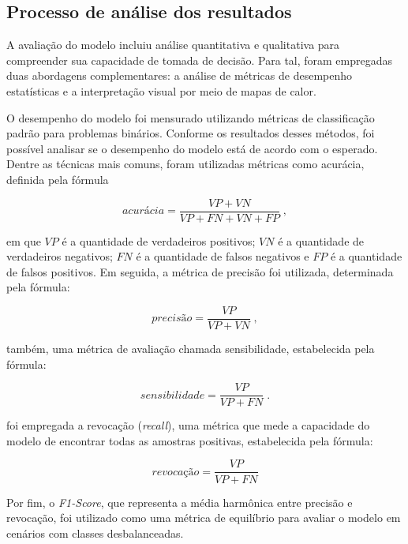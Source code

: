 \subsection{Processo de análise dos resultados}

A avaliação do modelo incluiu análise quantitativa e qualitativa para compreender sua capacidade de tomada de decisão. Para tal, foram empregadas duas abordagens complementares: a análise de métricas de desempenho estatísticas e a interpretação visual por meio de mapas de calor.

O desempenho do modelo foi mensurado utilizando métricas de classificação padrão para problemas binários. Conforme os resultados desses métodos, foi possível analisar se o desempenho do modelo está de acordo com o esperado. Dentre as técnicas mais comuns, foram utilizadas métricas como acurácia, definida pela fórmula 

\begin{equation}
  acurácia = \frac{VP +VN}{VP + FN + VN + FP} \; ,
    \label{eq: acuracia}
\end{equation}

\noindent em que \(VP\) é a quantidade de verdadeiros positivos; \(VN\) é a quantidade de verdadeiros negativos; \(FN\) é a quantidade de falsos negativos e \(FP\) é a quantidade de falsos positivos. Em seguida, a métrica de precisão foi utilizada, determinada pela fórmula:

\begin{equation} 
  precisão = \frac{VP}{VP + VN} \; ,
  \label{eq: precisao}
\end{equation}

\noindent também, uma métrica de avaliação chamada sensibilidade, estabelecida pela fórmula:

\begin{equation}
sensibilidade = \frac{VP}{VP + FN} \; .
  \label{eq: sensibilidade}
\end{equation}

\noindent foi empregada a revocação (\textit{recall}), uma métrica que mede a capacidade do modelo de encontrar todas as amostras positivas, estabelecida pela fórmula:

\begin{equation}
revocação = \frac{VP}{VP + FN}
  \label{eq:revocacao}
\end{equation}

Por fim, o \textit{F1-Score}, que representa a média harmônica entre precisão e revocação, foi utilizado como uma métrica de equilíbrio para avaliar o modelo em cenários com classes desbalanceadas.

